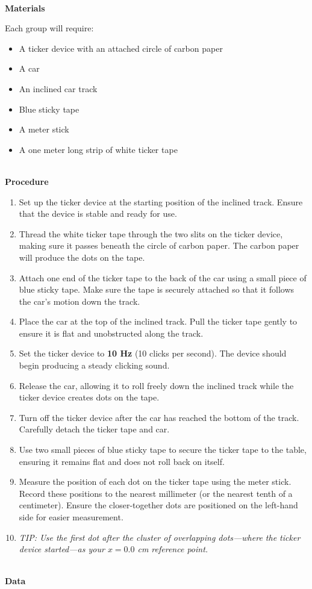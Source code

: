 \begin{questions}
\newpage

\textbf{\\\Large Materials\\}

Each group will require:
\begin{itemize} 
    \item A ticker device with an attached circle of carbon paper 
    \item A car
    \item An inclined car track 
    \item Blue sticky tape 
    \item A meter stick
    \item A one meter long strip of white ticker tape
\end{itemize}

\textbf{\\\Large Procedure\\}

\begin{enumerate}
    \item Set up the ticker device at the starting position of the inclined track. Ensure that the device is stable and ready for use.
    \item Thread the white ticker tape through the two slits on the ticker device, making sure it passes beneath the circle of carbon paper. The carbon paper will produce the dots on the tape.
    \item Attach one end of the ticker tape to the back of the car using a small piece of blue sticky tape. Make sure the tape is securely attached so that it follows the car's motion down the track.
    \item Place the car at the top of the inclined track. Pull the ticker tape gently to ensure it is flat and unobstructed along the track.
    \item Set the ticker device to \textbf{10 Hz} (10 clicks per second). The device should begin producing a steady clicking sound.
    \item Release the car, allowing it to roll freely down the inclined track while the ticker device creates dots on the tape.
    \item Turn off the ticker device after the car has reached the bottom of the track. Carefully detach the ticker tape and car.
    \item Use two small pieces of blue sticky tape to secure the ticker tape to the table, ensuring it remains flat and does not roll back on itself.
    \item Measure the position of each dot on the ticker tape using the meter stick. Record these positions to the nearest millimeter (or the nearest tenth of a centimeter). Ensure the closer-together dots are positioned on the left-hand side for easier measurement.
    \item \textit{TIP: Use the first dot after the cluster of overlapping dots---where the ticker device started---as your $x = 0.0$ cm reference point.}
\end{enumerate}
\newpage
\textbf{\\\Large Data\\}


\end{questions}

